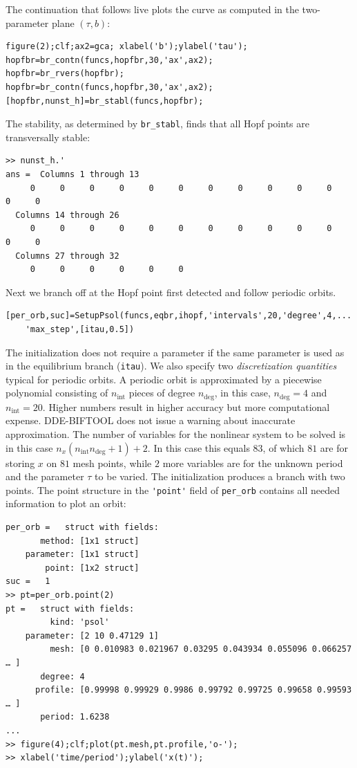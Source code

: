 \documentclass[10pt]{scrartcl}
\newcommand{\DDEBIFCODE}{\textsc{DDE-BIFTOOL}}
\newcommand{\blist}[1]{\mbox{\lstinline!#1!}}
\begin{document}
The continuation that follows live plots the curve as computed in the two-parameter plane $(\tau,b)$:
\begin{lstlisting}
figure(2);clf;ax2=gca; xlabel('b');ylabel('tau');
hopfbr=br_contn(funcs,hopfbr,30,'ax',ax2);
hopfbr=br_rvers(hopfbr);
hopfbr=br_contn(funcs,hopfbr,30,'ax',ax2);
[hopfbr,nunst_h]=br_stabl(funcs,hopfbr); 
\end{lstlisting}
The stability, as determined by \blist{br_stabl}, finds that all Hopf points are transversally stable:
\begin{verbatim}
>> nunst_h.'
ans =  Columns 1 through 13
     0     0     0     0     0     0     0     0     0     0     0     0     0
  Columns 14 through 26
     0     0     0     0     0     0     0     0     0     0     0     0     0
  Columns 27 through 32
     0     0     0     0     0     0
\end{verbatim}
Next we branch off at the Hopf point first detected and follow periodic orbits.
\begin{lstlisting}
[per_orb,suc]=SetupPsol(funcs,eqbr,ihopf,'intervals',20,'degree',4,...
    'max_step',[itau,0.5])
\end{lstlisting}
The initialization does not require a parameter if the same parameter
is used as in the equilibrium branch (\blist{itau}). We also specify
two \emph{discretization quantities} typical for periodic orbits. A
periodic orbit is approximated by a piecewise polynomial consisting of
$n_\mathrm{int}$ pieces of degree $n_\mathrm{deg}$, in this case,
$n_\mathrm{deg}=4$ and $n_\mathrm{int}=20$. Higher numbers result in
higher accuracy but more computational expense. {\DDEBIFCODE} does not
issue a warning about inaccurate approximation. The number of
variables for the nonlinear system to be solved is in this case
$n_x(n_\mathrm{int}n_\mathrm{deg}+1)+2$. In this case this equals
$83$, of which $81$ are for storing $x$ on $81$ mesh points, while $2$
more variables are for the unknown period and the parameter $\tau$ to
be varied. The initialization produces a branch with two points. The
point structure in the \blist{'point'} field of \blist{per_orb}
contains all needed information to plot an orbit:
\begin{verbatim}
per_orb =   struct with fields:
       method: [1x1 struct]
    parameter: [1x1 struct]
        point: [1x2 struct]
suc =   1
>> pt=per_orb.point(2)
pt =   struct with fields:
         kind: 'psol'
    parameter: [2 10 0.47129 1]
         mesh: [0 0.010983 0.021967 0.03295 0.043934 0.055096 0.066257 … ]
       degree: 4
      profile: [0.99998 0.99929 0.9986 0.99792 0.99725 0.99658 0.99593 … ]
       period: 1.6238
...
>> figure(4);clf;plot(pt.mesh,pt.profile,'o-');
>> xlabel('time/period');ylabel('x(t)');
\end{verbatim}
\end{document}
